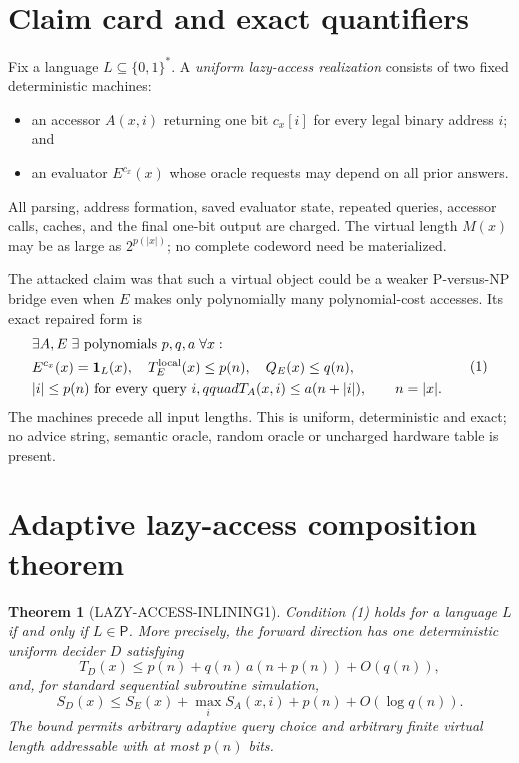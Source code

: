 \documentclass[11pt]{article}
\newtheorem{theorem}{Theorem}
\newcommand{\Pclass}{\mathsf{P}}
\begin{document}
\section{Claim card and exact quantifiers}
Fix a language $L\subseteq\{0,1\}^*$.  A \emph{uniform lazy-access
realization} consists of two fixed deterministic machines:
\begin{itemize}
\item an accessor $A(x,i)$ returning one bit $c_x[i]$ for every legal binary
address $i$; and
\item an evaluator $E^{c_x}(x)$ whose oracle requests may depend on all prior
answers.
\end{itemize}
All parsing, address formation, saved evaluator state, repeated queries,
accessor calls, caches, and the final one-bit output are charged.  The virtual
length $M(x)$ may be as large as $2^{p(|x|)}$; no complete codeword need be
materialized.

The attacked claim was that such a virtual object could be a weaker
P-versus-NP bridge even when $E$ makes only polynomially many polynomial-cost
accesses.  Its exact repaired form is
\[
\begin{split}
&\exists A,E\;\exists\text{ polynomials }p,q,a\;\forall x:\qquad\\
&E^{c_x}(x)=\mathbf 1_L(x),\quad
T_E^{\rm local}(x)\le p(n),\quad Q_E(x)\le q(n),\\
&|i|\le p(n)\text{ for every query }i,qquad
T_A(x,i)\le a(n+|i|),\qquad n=|x|.
\end{split}\tag{1}
\]
The machines precede all input lengths.  This is uniform, deterministic and
exact; no advice string, semantic oracle, random oracle or uncharged hardware
table is present.

\section{Adaptive lazy-access composition theorem}
\begin{theorem}[LAZY-ACCESS-INLINING1]
Condition (1) holds for a language $L$ if and only if $L\in\Pclass$.
More precisely, the forward direction has one deterministic uniform decider
$D$ satisfying
\[
 T_D(x)\le p(n)+q(n)\,a(n+p(n))+O(q(n)),                 \tag{2}
\]
and, for standard sequential subroutine simulation,
\[
 S_D(x)\le S_E(x)+\max_i S_A(x,i)+p(n)+O(\log q(n)).     \tag{3}
\]
The bound permits arbitrary adaptive query choice and arbitrary finite
virtual length addressable with at most $p(n)$ bits.
\end{theorem}
\end{document}
